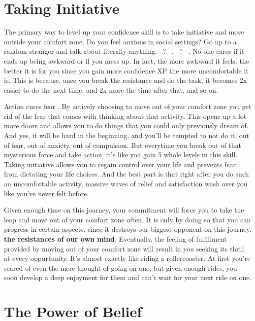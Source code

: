 \documentclass[
]{book}
\begin{document}
\hypertarget{taking-initiative}{%
\section{Taking Initiative}\label{taking-initiative}}

The primary way to level up your confidence skill is to take initiative and move outside your comfort zone. Do you feel anxious in social settings? Go up to a random stranger and talk about literally anything. --? --. --? --. No one cares if it ends up being awkward or if you mess up. In fact, the more awkward it feels, the better it is for you since you gain more confidence XP the more uncomfortable it is. This is because, once you break the resistance and do the task, it becomes 2x easier to do the next time, and 2x more the time after that, and so on.

Action cures fear \citep{action_cures_fear}. By actively choosing to move out of your comfort zone you get rid of the fear that comes with thinking about that activity. This opens up a lot more doors and allows you to do things that you could only previously dream of. And yes, it will be hard in the beginning, and you'll be tempted to not do it, out of fear, out of anxiety, out of compulsion. But everytime you break out of that mysterious force and take action, it's like you gain 5 whole levels in this skill. Taking initiative allows you to regain control over your life and prevents fear from dictating your life choices. And the best part is that right after you do such an uncomfortable activity, massive waves of relief and satisfaction wash over you like you've never felt before.

Given enough time on this journey, your commitment will force you to take the leap and move out of your comfort zone often. It is only by doing so that you can progress in certain aspects, since it destroys our biggest opponent on this journey, \textbf{the resistances of our own mind}. Eventually, the feeling of fulfillment provided by moving out of your comfort zone will result in you seeking its thrill at every oppurtunity. It's almost exactly like riding a rollercoaster. At first you're scared of even the mere thought of going on one, but given enough rides, you soon develop a deep enjoyment for them and can't wait for your next ride on one.

\hypertarget{the-power-of-belief}{%
\section{The Power of Belief}\label{the-power-of-belief}}
\end{document}
